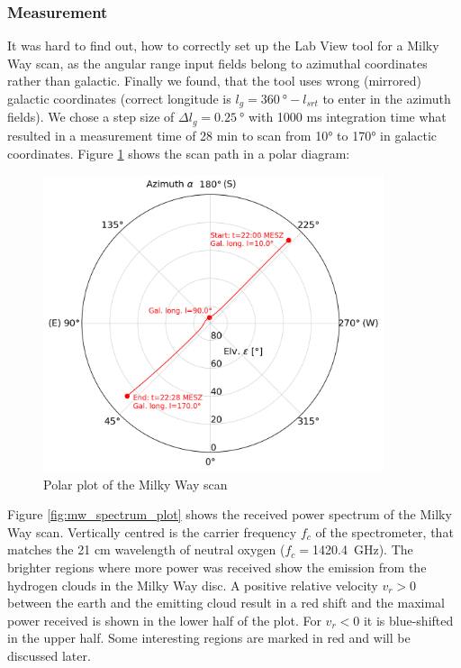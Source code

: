 \subsubsection{Measurement}
It was hard to find out, how to correctly set up the Lab View tool for a Milky Way scan, as the angular range input fields belong to azimuthal coordinates rather than galactic. 
Finally we found, that the tool uses wrong (mirrored) galactic coordinates (correct longitude is $l_g=\SI{360}{\degree}-l_{srt}$ to enter in the azimuth fields). We chose a step size of $\Delta l_g=\SI{0.25}{\degree}$ with 1000 ms integration time what resulted in a measurement time of 28 min to scan from 10° to 170° in galactic coordinates. Figure \ref{fig:mw_scan_polar} shows the scan path in a polar diagram:

\begin{figure}[H]
    \centering
    \includegraphics[width=10cm]{assets/mw_scan_polar.png}
    \caption{Polar plot of the Milky Way scan}
    \label{fig:mw_scan_polar}
\end{figure}

Figure \ref{fig:mw_spectrum_plot} shows the received power spectrum of the Milky Way scan. Vertically centred is the carrier frequency $f_c$ of the spectrometer, that matches the 21 cm wavelength of neutral oxygen ($f_c=$\SI{1420.4}{\giga\hertz}).
The brighter regions where more power was received show the emission from the hydrogen clouds in the Milky Way disc. A positive relative velocity $v_r>0$ between the earth and the emitting cloud result in a red shift and the maximal power received is shown in the lower half of the plot. For $v_r<0$ it is blue-shifted in the upper half. Some interesting regions are marked in red and will be discussed later.



